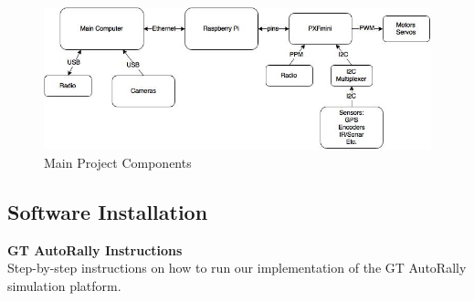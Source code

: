 \documentclass[compsoc,draftclsnofoot,onecolumn,10pt]{IEEEtran}
\begin{document}
        \begin{figure}[h]
            \centering
            \includegraphics{Block_Diagram}
            \caption{Main Project Components}
            \label{fig:my_label}
        \end{figure}

    \subsection{Software Installation}
    \textbf{GT AutoRally Instructions}\\
    Step-by-step instructions on how to run our implementation of the GT AutoRally simulation platform.\\
\end{document}
